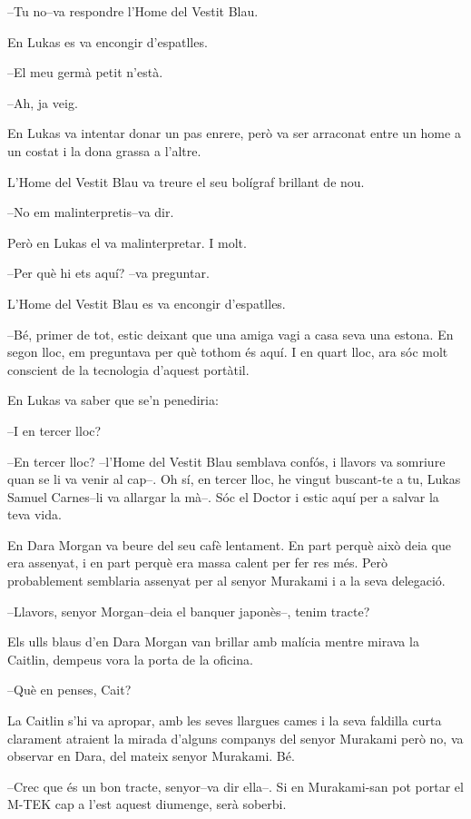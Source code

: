 --Tu no--va respondre l'Home del Vestit Blau.

En Lukas es va encongir d'espatlles.

--El meu germà petit n'està.

--Ah, ja veig.

En Lukas va intentar donar un pas enrere, però va ser arraconat entre un
home a un costat i la dona grassa a l'altre.

L'Home del Vestit Blau va treure el seu bolígraf brillant de nou.

--No em malinterpretis--va dir.

Però en Lukas el va malinterpretar. I molt.

--Per què hi ets aquí? --va preguntar.

L'Home del Vestit Blau es va encongir d'espatlles.

--Bé, primer de tot, estic deixant que una amiga vagi a casa seva una
estona. En segon lloc, em preguntava per què tothom és aquí. I en quart
lloc, ara sóc molt conscient de la tecnologia d'aquest portàtil.

En Lukas va saber que se'n penediria:

--I en tercer lloc?

--En tercer lloc? --l'Home del Vestit Blau semblava confós, i llavors va
somriure quan se li va venir al cap--. Oh sí, en tercer lloc, he vingut
buscant-te a tu, Lukas Samuel Carnes--li va allargar la mà--. Sóc el
Doctor i estic aquí per a salvar la teva vida.

En Dara Morgan va beure del seu cafè lentament. En part perquè això deia
que era assenyat, i en part perquè era massa calent per fer res més.
Però probablement semblaria assenyat per al senyor Murakami i a la seva
delegació.

--Llavors, senyor Morgan--deia el banquer japonès--, tenim tracte?

Els ulls blaus d'en Dara Morgan van brillar amb malícia mentre mirava la
Caitlin, dempeus vora la porta de la oficina.

--Què en penses, Cait?

La Caitlin s'hi va apropar, amb les seves llargues cames i la seva
faldilla curta clarament atraient la mirada d'alguns companys del senyor
Murakami però no, va observar en Dara, del mateix senyor Murakami. Bé.

--Crec que és un bon tracte, senyor--va dir ella--. Si en Murakami-san
pot portar el M-TEK cap a l'est aquest diumenge, serà soberbi.

